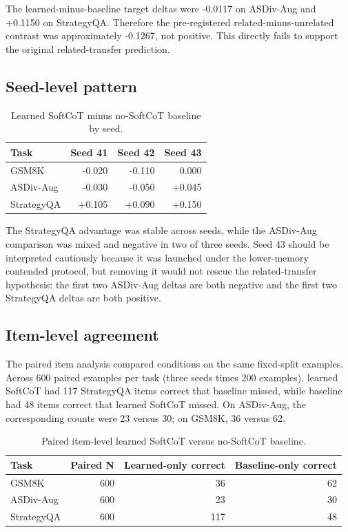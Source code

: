 \documentclass{article}
\begin{document}
The learned-minus-baseline target deltas were -0.0117 on ASDiv-Aug and +0.1150 on StrategyQA. Therefore the pre-registered related-minus-unrelated contrast was approximately -0.1267, not positive. This directly fails to support the original related-transfer prediction.

\subsection{Seed-level pattern}

\begin{table}[h]
\centering
\caption{Learned SoftCoT minus no-SoftCoT baseline by seed.}
\label{tab:deltas}
\begin{tabular}{lrrr}
\toprule
Task & Seed 41 & Seed 42 & Seed 43 \\
\midrule
GSM8K & -0.020 & -0.110 & 0.000 \\
ASDiv-Aug & -0.030 & -0.050 & +0.045 \\
StrategyQA & +0.105 & +0.090 & +0.150 \\
\bottomrule
\end{tabular}
\end{table}

The StrategyQA advantage was stable across seeds, while the ASDiv-Aug comparison was mixed and negative in two of three seeds. Seed 43 should be interpreted cautiously because it was launched under the lower-memory contended protocol, but removing it would not rescue the related-transfer hypothesis: the first two ASDiv-Aug deltas are both negative and the first two StrategyQA deltas are both positive.

\subsection{Item-level agreement}

The paired item analysis compared conditions on the same fixed-split examples. Across 600 paired examples per task (three seeds times 200 examples), learned SoftCoT had 117 StrategyQA items correct that baseline missed, while baseline had 48 items correct that learned SoftCoT missed. On ASDiv-Aug, the corresponding counts were 23 versus 30; on GSM8K, 36 versus 62.

\begin{table}[h]
\centering
\caption{Paired item-level learned SoftCoT versus no-SoftCoT baseline.}
\label{tab:item}
\begin{tabular}{lrrr}
\toprule
Task & Paired N & Learned-only correct & Baseline-only correct \\
\midrule
GSM8K & 600 & 36 & 62 \\
ASDiv-Aug & 600 & 23 & 30 \\
StrategyQA & 600 & 117 & 48 \\
\bottomrule
\end{tabular}
\end{table}
\end{document}
